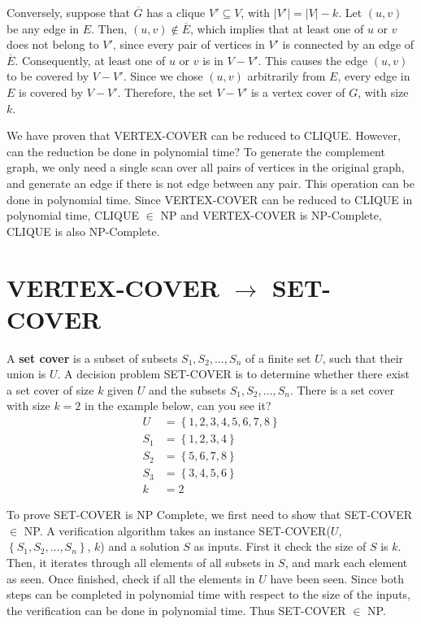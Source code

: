 \documentclass{article}
\begin{document}
Conversely, suppose that $\overline{G}$ has a clique $V' \subseteq V$, with
$|V'| = |V| - k$. Let $(u, v)$ be any edge in $E$. Then, $(u, v) \notin
\overline{E}$, which implies that at least one of $u$ or $v$ does not belong
to $V'$, since every pair of vertices in $V'$ is connected by an edge of
$\overline{E}$. Consequently, at least one of $u$ or $v$ is in $V-V'$.
This causes the edge $(u, v)$ to be covered by $V-V'$.
Since we chose $(u, v)$ arbitrarily from $E$, every edge in $E$ is covered
by $V-V'$. Therefore, the set $V-V'$ is a vertex cover of $G$, with size
$k$.

We have proven that VERTEX-COVER can be reduced to CLIQUE. However, can
the reduction be done in polynomial time? To generate the complement graph,
we only need a single scan over all pairs of vertices in the original graph,
and generate an edge if there is not edge between any pair.
This operation can be done in polynomial time.
Since VERTEX-COVER can be reduced to CLIQUE in polynomial time, 
CLIQUE $\in$ NP and VERTEX-COVER is NP-Complete, CLIQUE is also NP-Complete.

\section{VERTEX-COVER $\rightarrow$ SET-COVER}

A {\bf set cover} is a subset of subsets $S_1, S_2, \dots, S_n$ 
of a finite set $U$, such that their union is $U$.
A decision problem SET-COVER is to determine whether there exist a set cover
of size $k$ given $U$ and the subsets $S_1, S_2, \dots, S_n$.
There is a set cover with size $k=2$ in the example below, can you see it?
\begin{equation}
\begin{split}
	U &= \left\{1,2,3,4,5,6,7,8\right\} \\
	S_1 &= \left\{ 1,2,3,4 \right\} \\
	S_2 &= \left\{ 5,6,7,8 \right\} \\
	S_3 &= \left\{ 3,4,5,6 \right\}\\
	k &= 2
\end{split}
\end{equation}

To prove SET-COVER is NP Complete, we first need to show that SET-COVER $\in$
NP. A verification algorithm takes an instance SET-COVER($U$, $\left\{ S_1,
S_2, \dots, S_n\right\}$, $k$) and a solution $S$ as inputs.
First it check the size of $S$ is $k$. Then, it iterates through all elements 
of all subsets in $S$, and mark each element as seen. Once finished, check if 
all the elements in $U$ have been seen. Since both steps can be completed in
polynomial time with respect to the size of the inputs, the verification can
be done in polynomial time. Thus SET-COVER $\in$ NP.
\end{document}
